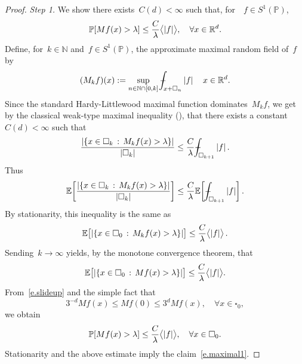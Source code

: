 \documentclass[11pt,twoside]{article} %
\let\oldsquare\square %
\renewcommand{\square}{\oldsquare}
\numberwithin{equation}{section}
\theoremstyle{definition}
\let\originalleft\left
\let\originalright\right
\renewcommand{\left}{\mathopen{}\mathclose\bgroup\originalleft}
\renewcommand{\right}{\aftergroup\egroup\originalright}
\newcommand*{\N}{\ensuremath{\mathbb{N}}}
\newcommand*{\Rd}{\ensuremath{\mathbb{R}^d}}
\newcommand{\cu}{\square}
\renewcommand{\P}{\mathbb{P}}
\newcommand{\E}{\mathbb{E}}
\def\Xint#1{\mathchoice
{\XXint\displaystyle\textstyle{#1}}%
{\XXint\textstyle\scriptstyle{#1}}%
{\XXint\scriptstyle\scriptscriptstyle{#1}}%
{\XXint\scriptscriptstyle\scriptscriptstyle{#1}}%
\!\int}
\def\XXint#1#2#3{{\setbox0=\hbox{$#1{#2#3}{\int}$}
\vcenter{\hbox{$#2#3$}}\kern-.5\wd0}}
\def\fint{\Xint-}
\begin{document}
\begin{proof}


\emph{Step 1.}
We show there exists~$C(d)<\infty$ such that, for~~$f\in S^1(\P)$,
\begin{equation}
\label{e.maximal1}
\P \left[ Mf(x) > \lambda \right] \leq \frac{C}{\lambda} \bigl \langle |f| \bigr\rangle, \quad \forall x\in \Rd.
\end{equation}
Define, for~$k\in\N$  and~$f\in S^1(\P)$, the approximate maximal random field of~$f$ by 
\begin{equation}
(M_kf)(x):= 
\sup_{n\in \N \cap [0,k]} 
\fint_{x+\cu_n} |f| \, \quad x\in \Rd.
\end{equation}
Since the standard Hardy-Littlewood maximal function dominates~$M_kf$, we get by the classical weak-type maximal inequality (\cite[Theorem 3.17]{Folland}), that there exists a constant~$C(d)<\infty$ such that 
\begin{equation}
\frac{\left| \left\{ x \in \cu_k \,:\, M_kf(x) > \lambda \right\} \right|}
{|\cu_k|}
\leq 
\frac{C}{\lambda}
\fint_{\cu_{k+1}} |f|\,. 
\end{equation}
Thus 
\begin{equation}
\E\left[ \frac{\left| \left\{ x \in \cu_k \,:\, M_kf(x) > \lambda \right\} \right|}
{|\cu_k|} \right]
\leq 
\frac{C}{\lambda}
\E \biggl[ 
\fint_{\cu_{k+1}} |f| \biggr]\,.
\end{equation}
By stationarity, this inequality is the same as 
\begin{equation}
\E\bigl[ \left| \left\{ x \in \cu_0 \,:\, M_kf(x) > \lambda \right\} \right| \bigr]
\leq
\frac{C}{\lambda} \bigl \langle |f| \bigr\rangle\,. 
\end{equation}
Sending~$k\to \infty$ yields, by the monotone convergence theorem, that
\begin{equation}
\label{e.slideup}
\E\bigl[  \left| \left\{ x \in \cu_0 \,:\, Mf(x) > \lambda \right\} \right| \bigr]
\leq
\frac{C}{\lambda} \bigl \langle |f| \bigr\rangle. 
\end{equation}
From~\eqref{e.slideup} and the simple fact that
\begin{equation}
3^{-d} Mf (x) \leq Mf(0) \leq 3^d Mf(x), \quad \forall x\in \cu_0, 
\end{equation}
we obtain
\begin{equation}
\label{e.maximal11}
\P \left[ Mf(x) > \lambda \right] \leq \frac{C}{\lambda} \bigl \langle |f| \bigr\rangle, \quad \forall x\in \cu_0.
\end{equation}
Stationarity and the above estimate imply the claim~\eqref{e.maximal1}. 


\end{proof}
\end{document}
